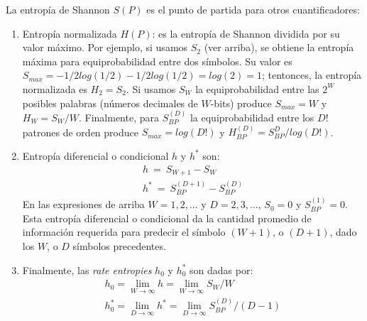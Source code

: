 La entropía de Shannon $S(P)$ es el punto de partida para otros cuantificadores:
%
\begin{enumerate}
	\item Entropía normalizada $H(P)$: es la entropía de Shannon dividida por su valor máximo. Por ejemplo, si usamos $S_2$ (ver arriba), se obtiene la entropía máxima para equiprobabilidad entre dos símbolos. Su valor es $S_{max}=-1/2 log(1/2)-1/2 log(1/2)=log(2)=1$; tentonces, la entropía normalizada es $H_2=S_2$. Si usamos $S_W$ la equiprobabilidad entre las $2^W$ posibles palabras (números decimales de $W$-bits) produce $S_{max}=W$ y $H_W=S_W/W$. Finalmente, para $S^{(D)}_{BP}$ la equiprobabilidad entre los $D!$ patrones de orden produce $S_{max}= log(D!)$ y $H^{(D)}_{BP}=S^D_{BP}/log(D!)$.
	\item Entropía diferencial o condicional $h$ y $h^*$ son:
	\begin{eqnarray}
	h~=~S_{W+1}-S_W\\
	h^*~=~S_{BP}^{(D+1)}-S_{BP}^{(D)}
	\end{eqnarray}
	En las expresiones de arriba $W=1,2,...$ y $D=2,3,...$, $S_0=0$ y $S_{BP}^{(1)}=0$. Esta entropía diferencial o condicional da la cantidad promedio de información requerida para predecir el símbolo $(W+1)$, o $(D+1)$, dado los $W$, o $D$ símbolos precedentes.
	\item Finalmente, las \emph{rate entropies} $h_0$ y $h_0^*$ \cite{Ebeling2001,Amigo2005} son dadas por:
	\begin{eqnarray}
	h_0=\lim\limits_{W\rightarrow \infty} h=\lim\limits_{W\rightarrow \infty}{S_{W}/W }\\
	h^*_0= \lim\limits_{D\rightarrow \infty} h^*=\lim\limits_{D\rightarrow \infty}{S^{(D)}_{BP}/(D-1)}
	\end{eqnarray}
\end{enumerate}

